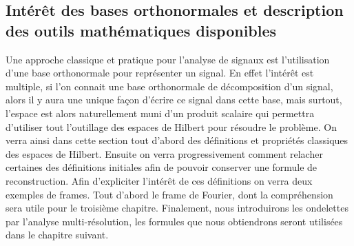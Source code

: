 \subsection{Intérêt des bases orthonormales et description des outils mathématiques disponibles}
Une approche classique et pratique pour l'analyse de signaux est l'utilisation d'une base orthonormale pour représenter un signal. 
En effet l'intérêt est multiple, si l'on connait une base orthonormale de décomposition d'un signal, alors il y aura une unique façon d'écrire ce signal dans cette base, mais surtout, l'espace est alors naturellement muni d'un produit scalaire qui permettra d'utiliser tout l'outillage des espaces de Hilbert pour résoudre le problème.
\newline
On verra ainsi dans cette section tout d'abord des définitions et propriétés classiques des espaces de Hilbert. 
Ensuite on verra progressivement comment relacher certaines des définitions initiales afin de pouvoir conserver une formule de reconstruction.
Afin d'expliciter l'intérêt de ces définitions on verra deux exemples de frames.
Tout d'abord le frame de Fourier, dont la compréhension sera utile pour le troisième chapitre.
Finalement, nous introduirons les ondelettes par l'analyse multi-résolution, les formules que nous obtiendrons seront utilisées dans le chapitre suivant.
